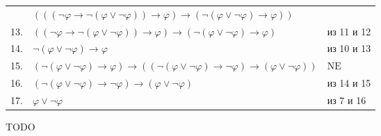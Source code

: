 \documentclass[12pt,a4paper]{article}
\begin{document}
\begin{enumproblem}
\begin{description}
\begin{center}
\begin{tabular}{rll}
                        &$(((\neg \varphi \rightarrow \neg (\varphi \vee \neg \varphi)) \rightarrow \varphi) \rightarrow (\neg (\varphi \vee \neg \varphi) \rightarrow \varphi))$&\\
                        13.& $((\neg \varphi \rightarrow \neg (\varphi \vee \neg \varphi)) \rightarrow \varphi) \rightarrow (\neg (\varphi \vee \neg \varphi) \rightarrow \varphi)$& из 11 и 12\\
                        14.& $\neg (\varphi \vee \neg \varphi) \rightarrow \varphi$& из 10 и 13\\
                        15.& $(\neg (\varphi \vee \neg \varphi) \rightarrow \varphi) \rightarrow ((\neg (\varphi \vee \neg \varphi) \rightarrow \neg \varphi) \rightarrow (\varphi \vee \neg \varphi))$& $\mathrm{NE}$\\
                        16.& $(\neg (\varphi \vee \neg \varphi) \rightarrow \neg \varphi) \rightarrow (\varphi \vee \neg \varphi)$& из 14 и 15\\
                        17.& $\varphi \vee \neg \varphi$& из 7 и 16\\
                    \end{tabular}
                \end{center}
        \end{description}
    \end{enumproblem}

    \begin{enumproblem}
        TODO
    \end{enumproblem}
\end{document}
